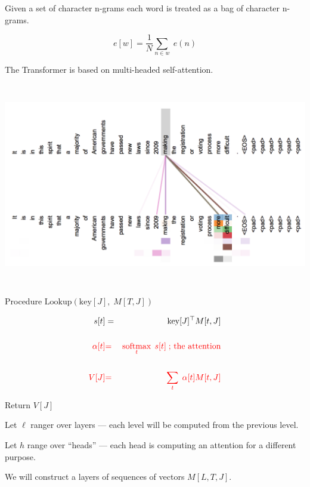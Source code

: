 {\vfill
Given a set of character n-grams each word is treated as a bag of character n-grams.

\vfill
$$e[w] = \frac{1}{N} \sum_{n \in w}\; e(n)$$


The Transformer is based on multi-headed self-attention.

\centerline{\includegraphics[height  = 3.5in]{../images/Transformera}}

Procedure $\mathrm{Lookup}(\mathrm{key}[J],\;M[T,J])$

\bigskip
\begin{eqnarray*}
s[t] & = &\mathrm{key}[J]^\top M[t,J] \\
\\
{\color{red} \alpha[t]} & {\color{red} =} & {\color{red} \operatorname*{softmax}_t \;s[t]\;\mbox{; the attention}} \\
\\
{\color{red} V[J]} & {\color{red} =} & {\color{red} \sum_t\;\alpha[t]M[t,J]}
\end{eqnarray*}

\bigskip
Return $V[J]$


\vfill
Let $\ell$ ranger over layers --- each level will be computed from the previous level.

\vfill
Let $h$ range over ``heads'' --- each head is computing an attention for a different purpose.

\vfill
We will construct a layers of sequences of vectors $M[L,T,J]$.

}
